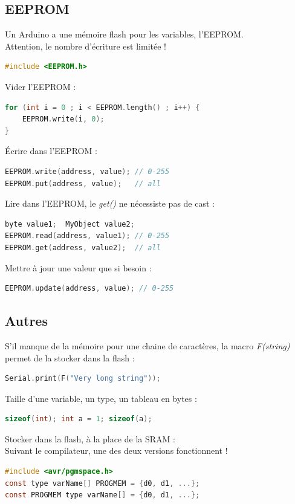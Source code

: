         \subsection{EEPROM}
            Un Arduino a une mémoire flash pour les variables, l'EEPROM.\\
            Attention, le nombre d'écriture est limitée !
            \begin{lstlisting}[language=C]
#include <EEPROM.h>
            \end{lstlisting}
            Vider l'EEPROM :
            \begin{lstlisting}[language=C]
for (int i = 0 ; i < EEPROM.length() ; i++) {
    EEPROM.write(i, 0);
}
            \end{lstlisting}
            Écrire dans l'EEPROM :
            \begin{lstlisting}[language=C]
EEPROM.write(address, value); // 0-255
EEPROM.put(address, value);   // all
            \end{lstlisting}
            Lire dans l'EEPROM, le \textit{get()} ne nécessiste pas de cast :
            \begin{lstlisting}[language=C]
byte value1;  MyObject value2;
EEPROM.read(address, value1); // 0-255
EEPROM.get(address, value2);  // all
            \end{lstlisting}
            Mettre à jour une valeur que si besoin :
            \begin{lstlisting}[language=C]
EEPROM.update(address, value); // 0-255
            \end{lstlisting}

        \subsection{Autres}
            S'il manque de la mémoire pour une chaine de caractères, la macro \textit{F(string)} permet de la stocker dans la flash :
            \begin{lstlisting}[language=C]
Serial.print(F("Very long string"));
            \end{lstlisting}
            Taille d'une variable, un type, un tableau en bytes :
            \begin{lstlisting}[language=C]
sizeof(int); int a = 1; sizeof(a);
            \end{lstlisting}
            Stocker dans la flash, à la place de la SRAM :\\
            Suivant le compilateur, une des deux versions fonctionnent !
            \begin{lstlisting}[language=C]
#include <avr/pgmspace.h>
const type varName[] PROGMEM = {d0, d1, ...};
const PROGMEM type varName[] = {d0, d1, ...};
            \end{lstlisting}



